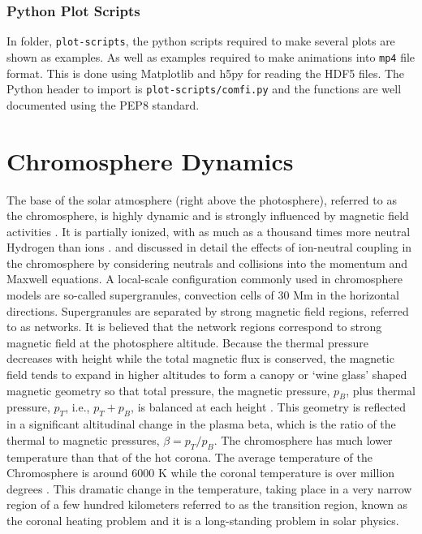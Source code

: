 \documentclass[12pt,upcase]{umlthesis}
\def\code#1{\texttt{#1}}
\begin{document}
\subsection{Python Plot Scripts}

In folder, \code{plot-scripts}, the python scripts required to make several plots are shown as examples. As well as examples required to make animations into \code{mp4} file format. This is done using Matplotlib and h5py for reading the HDF5 files. The Python header to import is \code{plot-scripts/comfi.py} and the functions are well documented using the PEP8 standard.

\chapter{Chromosphere Dynamics}\label{chap:chromosphere} 

The base of the solar atmosphere (right above the photosphere), referred to as the chromosphere, is highly dynamic and is strongly influenced by magnetic field activities \citep{Hasan08}. It is partially ionized, with as much as a thousand times more neutral Hydrogen than ions \citep{Alissandrakis2018}. \citet{Song2011} and \citet{Leake2014} discussed in detail the effects of ion-neutral coupling in  the chromosphere by considering neutrals and collisions into the momentum and Maxwell equations. A local-scale configuration commonly used in chromosphere models are so-called supergranules, convection cells of 30 Mm in the horizontal directions. Supergranules are separated by strong magnetic field regions, referred to as networks. It is believed that the network regions correspond to strong magnetic field at the photosphere altitude. Because the thermal pressure decreases with height while the total magnetic flux is conserved, the magnetic field tends to expand in higher altitudes to form a canopy or `wine glass' shaped magnetic geometry so that total pressure, the  magnetic pressure, $p_B$, plus thermal pressure, $p_T$, i.e., $p_T+p_B$, is balanced at each height \citep{gabriel1976}. This geometry is reflected in a significant altitudinal change in the plasma beta, which is the ratio of the thermal to magnetic pressures, $\beta=p_T/p_B$. The chromosphere has much lower temperature than that of the hot corona. The average temperature of the Chromosphere is around 6000 K while the coronal temperature is over million degrees \citep{AvrettLoeser2008}. This dramatic change in the temperature, taking place in a very narrow region of a few hundred kilometers referred to as the transition region, known as the coronal heating problem and it is a long-standing problem in solar physics.
\end{document}
